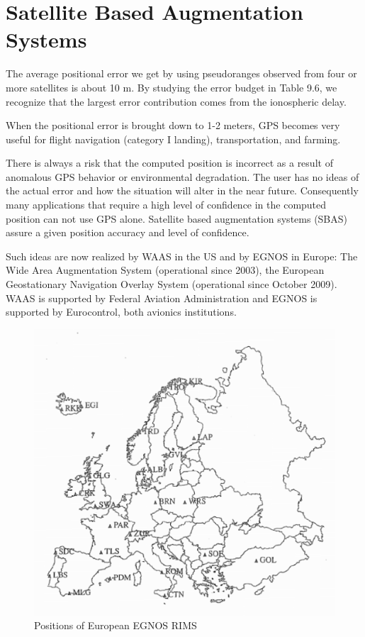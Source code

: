 \section{Satellite Based Augmentation Systems}
	The average positional error we get by using pseudoranges observed from four or more satellites is about 10 m. By studying the error budget in Table 9.6, we recognize that the largest error contribution comes from the ionospheric delay.
	
	When the positional error is brought down to 1-2 meters, GPS becomes very useful for flight navigation (category I landing), transportation, and farming.
	
	There is always a risk that the computed position is incorrect as a result of anomalous GPS behavior or environmental degradation. The user has no ideas of the actual error and how the situation will alter in the near future. Consequently many applications that require a high level of confidence in the computed position can not use GPS alone. Satellite based augmentation systems (SBAS) assure a given position accuracy and level of confidence.
		
	Such ideas are now realized by WAAS in the US and by EGNOS in Europe: The Wide Area Augmentation System (operational since 2003), the European Geostationary Navigation Overlay System (operational since October 2009). WAAS is supported by Federal Aviation Administration and EGNOS is supported by Eurocontrol, both avionics institutions.
	\begin{figure}
		\centering
		\includegraphics[width=0.7\linewidth]{TeX_files/Part03/chapter09/image/9-20}
		\caption{Positions of European EGNOS RIMS}
		\label{fig:9-20}
	\end{figure}

